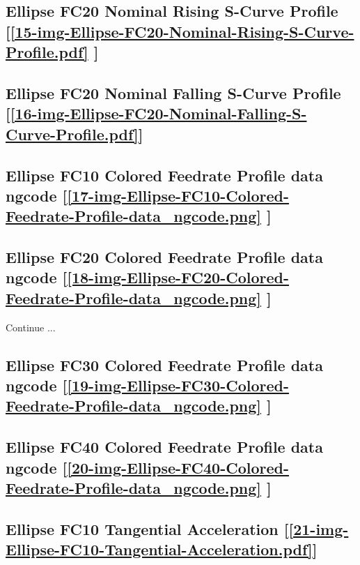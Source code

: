 \subsection     {Ellipse FC20 Nominal Rising S-Curve Profile
[\ref      {15-img-Ellipse-FC20-Nominal-Rising-S-Curve-Profile.pdf} ] }
\label{ssec-15-img-Ellipse-FC20-Nominal-Rising-S-Curve-Profile.pdf}

\subsection     {Ellipse FC20 Nominal Falling S-Curve Profile
[\ref      {16-img-Ellipse-FC20-Nominal-Falling-S-Curve-Profile.pdf}] }
\label{ssec-16-img-Ellipse-FC20-Nominal-Falling-S-Curve-Profile.pdf}

\subsection       {Ellipse FC10 Colored Feedrate Profile data ngcode
[\ref      {17-img-Ellipse-FC10-Colored-Feedrate-Profile-data_ngcode.png} ] }
\label{ssec-17-img-Ellipse-FC10-Colored-Feedrate-Profile-data_ngcode.png}

\subsection       {Ellipse FC20 Colored Feedrate Profile data ngcode
[\ref      {18-img-Ellipse-FC20-Colored-Feedrate-Profile-data_ngcode.png} ] }
\label{ssec-18-img-Ellipse-FC20-Colored-Feedrate-Profile-data_ngcode.png}

Continue ...\\

\subsection       {Ellipse FC30 Colored Feedrate Profile data ngcode
[\ref      {19-img-Ellipse-FC30-Colored-Feedrate-Profile-data_ngcode.png} ] }
\label{ssec-19-img-Ellipse-FC30-Colored-Feedrate-Profile-data_ngcode.png}

\subsection       {Ellipse FC40 Colored Feedrate Profile data ngcode
[\ref      {20-img-Ellipse-FC40-Colored-Feedrate-Profile-data_ngcode.png} ] }
\label{ssec-20-img-Ellipse-FC40-Colored-Feedrate-Profile-data_ngcode.png}

\subsection       {Ellipse FC10 Tangential Acceleration
[\ref      {21-img-Ellipse-FC10-Tangential-Acceleration.pdf}] }
\label{ssec-21-img-Ellipse-FC10-Tangential-Acceleration.pdf}


